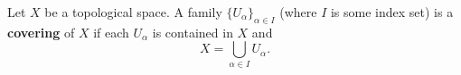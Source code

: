 Let $X$ be a topological space. A family $\{U_\alpha\}_{\alpha \in I}$ (where $I$ is some index set) is a \textbf{covering} of $X$ if each $U_\alpha$ is contained in $X$ and
$$X = \bigcup_{\alpha \in I} U_\alpha.$$
